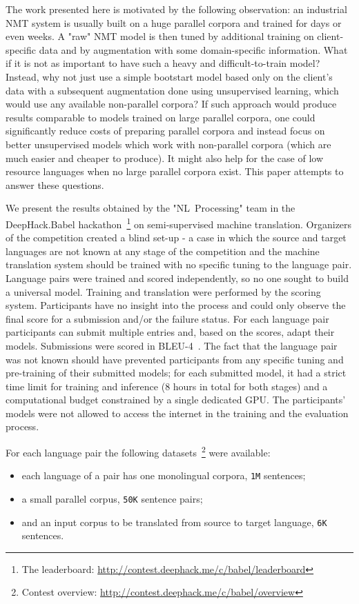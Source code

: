 \documentclass[]{article}
\begin{document}
The work presented here is motivated by the following observation: an industrial \ac{NMT} system is usually built on a huge parallel corpora and trained for days or even weeks.
A "raw" \ac{NMT} model is then tuned by additional training on client-specific data and by augmentation with some domain-specific information.
What if it is not as important to have such a heavy and difficult-to-train model?
Instead, why not just use a simple bootstart model based only on the client's data with a subsequent augmentation done using unsupervised learning, which would use any available non-parallel corpora?
If such approach would produce results comparable to models trained on large parallel corpora, one could significantly reduce costs of preparing parallel corpora and instead focus on better unsupervised models which work with non-parallel corpora (which are much easier and cheaper to produce).
It might also help for the case of low resource languages when no large parallel corpora exist.
This paper attempts to answer these questions.

We present the results obtained by the "NL~Processing" team in the DeepHack.Babel hackathon~\footnote{The leaderboard: \url{http://contest.deephack.me/c/babel/leaderboard}} on semi-supervised machine translation.
Organizers of the competition created a blind set-up - a case in which the source and target languages are not known at any stage of the competition and the machine translation system should be trained with no specific tuning to the language pair.
Language pairs were trained and scored independently, so no one sought to build a universal model.
Training and translation were performed by the scoring system.
Participants have no insight into the process and could only observe the final score for a submission and/or the failure status.
For each language pair participants can submit multiple entries and, based on the scores, adapt their models.
Submissions were scored in BLEU-4~\citep{papineni2002bleu}.
The fact that the language pair was not known should have prevented participants from any specific tuning and pre-training of their submitted models; for each submitted model, it had a strict time limit for training and inference (8 hours in total for both stages) and a computational budget constrained by a single dedicated GPU.
The participants' models were not allowed to access the internet in the training and the evaluation process.

For each language pair the following datasets~\footnote{Contest overview: \url{http://contest.deephack.me/c/babel/overview}} were available:
\begin{itemize}
  \item each language of a pair has one monolingual corpora, {\tt 1M} sentences;
  \item a small parallel corpus, {\tt 50K} sentence pairs;
  \item and an input corpus to be translated from source to target language, {\tt 6K} sentences.
\end{itemize}
\end{document}
